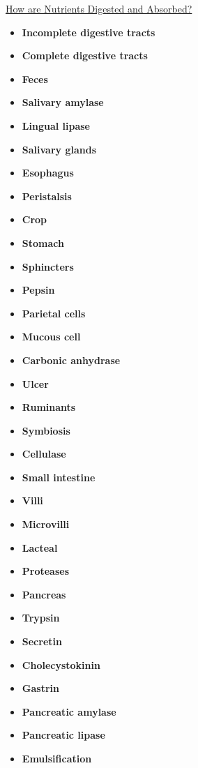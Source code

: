 \documentclass[12pt,letterpaper]{article}
\begin{document}
\hypertarget{41.3}{}
\begin{secbox}{\hyperlink{41}{How are Nutrients Digested and Absorbed?}}{
    \begin{itemize}
        \item \textbf{Incomplete digestive tracts }
        \item \textbf{Complete digestive tracts}
        \item \textbf{Feces}
        \item \textbf{Salivary amylase}
        \item \textbf{Lingual lipase}
        \item \textbf{Salivary glands}
        \item \textbf{Esophagus}
        \item \textbf{Peristalsis}
        \item \textbf{Crop}
        \item \textbf{Stomach}
        \item \textbf{Sphincters}
        \item \textbf{Pepsin}
        \item \textbf{Parietal cells}
        \item \textbf{Mucous cell}
        \item \textbf{Carbonic anhydrase}
        \item \textbf{Ulcer}
        \item \textbf{Ruminants}
        \item \textbf{Symbiosis}
        \item \textbf{Cellulase}
        \item \textbf{Small intestine}
        \item \textbf{Villi}
        \item \textbf{Microvilli}
        \item \textbf{Lacteal}
        \item \textbf{Proteases}
        \item \textbf{Pancreas}
        \item \textbf{Trypsin}
        \item \textbf{Secretin}
        \item \textbf{Cholecystokinin}
        \item \textbf{Gastrin}
        \item \textbf{Pancreatic amylase}
        \item \textbf{Pancreatic lipase}
        \item \textbf{Emulsification}

\end{itemize}}
\end{secbox}
\end{document}
